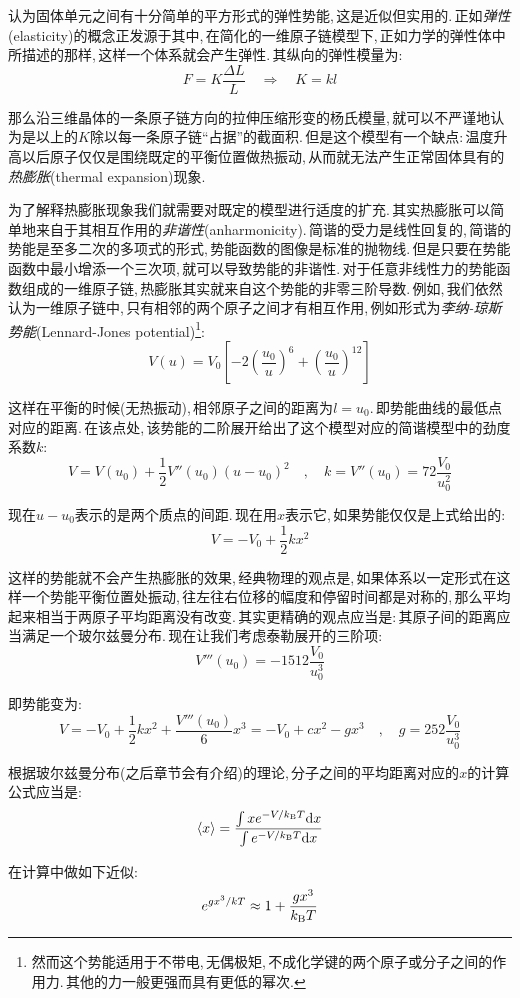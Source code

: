 认为固体单元之间有十分简单的平方形式的弹性势能,\,这是近似但实用的.\,正如\emph{弹性}(elasticity)的概念正发源于其中,\,在简化的一维原子链模型下,\,正如力学的弹性体中所描述的那样,\,这样一个体系就会产生弹性.\,其纵向的弹性模量为:
\[F=K\frac{\Delta L}{L}\quad \Rightarrow \quad K=kl\]

那么沿三维晶体的一条原子链方向的拉伸压缩形变的杨氏模量,\,就可以不严谨地认为是以上的$K$除以每一条原子链``占据''的截面积.\,但是这个模型有一个缺点:\,温度升高以后原子仅仅是围绕既定的平衡位置做热振动,\,从而就无法产生正常固体具有的\emph{热膨胀}(thermal expansion)现象.

为了解释热膨胀现象我们就需要对既定的模型进行适度的扩充.\,其实热膨胀可以简单地来自于其相互作用的\emph{非谐性}(anharmonicity).\,简谐的受力是线性回复的,\,简谐的势能是至多二次的多项式的形式,\,势能函数的图像是标准的抛物线.\,但是只要在势能函数中最小增添一个三次项,\,就可以导致势能的非谐性.\,对于任意非线性力的势能函数组成的一维原子链,\,热膨胀其实就来自这个势能的非零三阶导数.\,例如,\,我们依然认为一维原子链中,\,只有相邻的两个原子之间才有相互作用,\,例如形式为\emph{李纳-琼斯势能}(Lennard-Jones potential)\footnote{然而这个势能适用于不带电,\,无偶极矩,\,不成化学键的两个原子或分子之间的作用力.\,其他的力一般更强而具有更低的幂次.}:
\[V(u)=V_0  \left[ -2\left( \frac{u_0}{u} \right)^6+ \left( \frac{u_0}{u} \right)^{12}\right]  \]

这样在平衡的时候(无热振动),\,相邻原子之间的距离为$l=u_0$.\,即势能曲线的最低点对应的距离.\,在该点处,\,该势能的二阶展开给出了这个模型对应的简谐模型中的劲度系数$k$:
\[V=V(u_0)+\frac{1}{2}V''(u_0)(u-u_0)^2 \quad,\quad k=V''(u_0)=72\frac{V_0}{u_0^2}\]

现在$u-u_0$表示的是两个质点的间距.\,现在用$x$表示它,\,如果势能仅仅是上式给出的:
\[V=-V_0+\frac{1}{2}kx^2\]

这样的势能就不会产生热膨胀的效果,\,经典物理的观点是,\,如果体系以一定形式在这样一个势能平衡位置处振动,\,往左往右位移的幅度和停留时间都是对称的,\,那么平均起来相当于两原子平均距离没有改变.\,其实更精确的观点应当是:\,其原子间的距离应当满足一个玻尔兹曼分布.\,现在让我们考虑泰勒展开的三阶项:
\[V'''(u_0)=-1512\frac{V_0}{u_0^3}\]

即势能变为:
\[V=-V_0+\frac{1}{2}kx^2+\frac{V'''(u_0)}{6}x^3=-V_0+cx^2-gx^3 \quad,\quad g=252\frac{V_0}{u_0^3}\]

根据玻尔兹曼分布(之后章节会有介绍)的理论,\,分子之间的平均距离对应的$x$的计算公式应当是:
\[\langle x\rangle=\frac{\int xe^{-V/k_{\rm B}T}\textrm{d} x}{\int e^{-V/k_{\rm B}T}\textrm{d} x}\]

在计算中做如下近似:
\[e^{gx^3/kT}\approx1+\frac{gx^3}{k_{\rm B}T}\]

